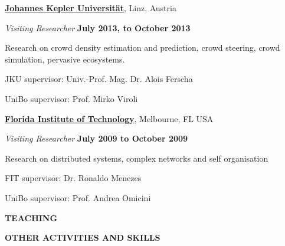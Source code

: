\documentclass[10pt]{article}
\newenvironment{outerlist}[1][\enskip\textbullet]%
        {\begin{itemize}[#1]}{\end{itemize}%
         \vspace{-.6\baselineskip}}
\newenvironment{innerlist}[1][\enskip\textbullet]%
        {\begin{compactitem}[#1]}{\end{compactitem}}
\newcommand{\halfblankline}{\quad\vspace{-0.5\baselineskip}\pagebreak[3]}
\newcommand{\macrosection}[1]{

\vspace{20pt}
\hrulefill
\begin{center}
\textbf{#1}
\end{center}
\vspace{-7pt}
\hrulefill
}
\begin{document}
\href{http://www.jku.at/}{\textbf{Johannes Kepler Universität}}, Linz, Austria
\begin{outerlist}
\item[] \textit{Visiting Researcher} \hfill \textbf{July 2013, to October 2013}
    \begin{innerlist}
      \item Research on crowd density estimation and prediction, crowd steering, crowd simulation, pervasive ecosystems.
      \item JKU supervisor: Univ.-Prof. Mag. Dr. Alois Ferscha
      \item UniBo supervisor: Prof. Mirko Viroli
    \end{innerlist}
\halfblankline
\end{outerlist}

\href{http://www.fit.edu/}{\textbf{Florida Institute of Technology}}, Melbourne, FL USA
\begin{outerlist}
\item[] \textit{Visiting Researcher} \hfill \textbf{July 2009 to October 2009}
    \begin{innerlist}
      \item Research on distributed systems, complex networks and self organisation
      \item FIT supervisor: Dr. Ronaldo Menezes
      \item UniBo supervisor: Prof. Andrea Omicini
    \end{innerlist}
\halfblankline
\end{outerlist}

\newpage
\macrosection{TEACHING}



\newpage
\macrosection{OTHER ACTIVITIES AND SKILLS}

\halfblankline{}

\newcount\languagecount
\newcommand\languageknowledge[2]
  {%
  \hbox
      {%
        \languagecount=0
        \loop\ifnum\languagecount<#2
          \advance\languagecount1
          \textcolor{languagecolor}{$\bullet$}%
        \repeat
        \loop\ifnum\languagecount<10
          \advance\languagecount1
          \textcolor{nolanguagecolor}{$\bullet$}%
        \repeat
        \hspace{5pt} #1
      }%

    }
\end{document}
